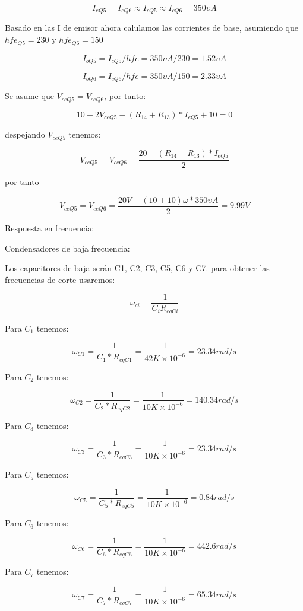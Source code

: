 \documentclass{article}
\begin{document}
$$ I_{eQ5} = I_{eQ6} \approx I_{cQ5} \approx I_{cQ6} = 350\upsilon A$$

Basado en las I de emisor ahora calulamos las corrientes de base, asumiendo que $hfe_{Q5} = 230 $ y $hfe_{Q6} = 150$

$$I_{bQ5} = I_{cQ5} / hfe = 350\upsilon A / 230 = 1.52 \upsilon A $$

$$I_{bQ6} = I_{cQ6} / hfe = 350\upsilon A / 150 = 2.33 \upsilon A $$

Se asume que $V_{ceQ5} = V_{ceQ6} $, por tanto:

$$ 10 - 2 V_{ceQ5} - (R_{14} + R_{13}) * I_{eQ5} + 10 = 0$$

despejando $V_{ceQ5}$ tenemos:

\begin{equation}
    V_{ceQ5} = V_{ceQ6} = \frac{ 20 - (R_{14} + R_{13}) * I_{eQ5} }{2}
\end{equation}

por tanto 

$$ V_{ceQ5} = V_{ceQ6} = \frac{ 20 V - (10 + 10) \omega * 350\upsilon A }{2} = 9.99 V$$

Respuesta en frecuencia:

Condensadores de baja frecuencia:
    
Los capacitores de baja serán C1, C2, C3, C5, C6 y C7. para obtener las frecuencias de corte usaremos:

$$ \omega_{ci} = \frac{1}{C_i R_{eqCi}}$$

Para $C_1$ tenemos:

$$ \omega_{C1} = \frac{1}{C_1 * R_{eqC1}} =  \frac{1}{42K \times 10^{-6}} = 23.34 rad / s$$ 

Para $C_2$ tenemos:

$$ \omega_{C2} = \frac{1}{C_2 * R_{eqC2}} =  \frac{1}{10K \times 10^{-6}} = 140.34 rad / s$$ 

Para $C_3$ tenemos:

$$ \omega_{C3} = \frac{1}{C_3 * R_{eqC3}} =  \frac{1}{10K \times 10^{-6}} = 23.34 rad / s$$ 

Para $C_5$ tenemos:

$$ \omega_{C5} = \frac{1}{C_5 * R_{eqC5}} =  \frac{1}{10K \times 10^{-6}} = 0.84 rad / s$$ 

Para $C_6$ tenemos:

$$ \omega_{C6} = \frac{1}{C_6 * R_{eqC6}} =  \frac{1}{10K \times 10^{-6}} = 442.6 rad / s$$ 

Para $C_7$ tenemos:

$$ \omega_{C7} = \frac{1}{C_7 * R_{eqC7}} =  \frac{1}{10K \times 10^{-6}} = 65.34 rad / s$$
\end{document}
